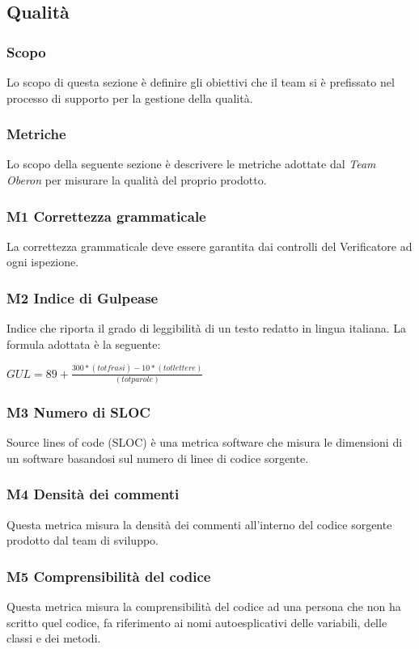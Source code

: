 \subsection{Qualità}
\subsubsection{Scopo}
Lo scopo di questa sezione è definire gli obiettivi che il team si è prefissato nel processo di supporto per la gestione della qualità.

\subsubsection{Metriche}
Lo scopo della seguente sezione è descrivere le metriche adottate dal \textit{Team Oberon} per misurare la qualità del proprio prodotto.
\subsubsection{M1 Correttezza grammaticale}
La correttezza grammaticale deve essere garantita dai controlli del Verificatore ad ogni ispezione.
\subsubsection{M2 Indice di Gulpease}
Indice che riporta il grado di leggibilità di un testo redatto in lingua italiana. La formula adottata è la seguente:
\begin{center}
    \begin{math}
        GUL = 89 + \frac{300 * ( tot frasi) -10 * (tot lettere)}{(tot parole)}
    \end{math}
\end{center}
\subsubsection{M3 Numero di SLOC}
Source lines of code (SLOC) è una metrica software che misura le dimensioni di un software basandosi sul numero di linee di codice sorgente.
\subsubsection{M4 Densità dei commenti}
Questa metrica misura la densità dei commenti all'interno del codice sorgente prodotto dal team di sviluppo.
\subsubsection{M5 Comprensibilità del codice}
Questa metrica misura la comprensibilità del codice ad una persona che non ha scritto quel codice, fa riferimento ai nomi autoesplicativi delle variabili, delle classi e dei metodi.
